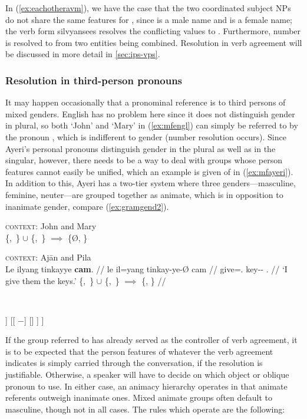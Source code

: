 In (\ref{ex:eachotheravm}), we have the case that the two coordinated subject
NPs do not share the same features for \Gend{}, since  is a male
name and  is a female name; the verb form 
{silvyan}{sees} resolves the conflicting values to \M{}. Furthermore, number is
resolved to \Pl{} from two \Sg{} entities being combined. Resolution in verb
agreement will be discussed in more detail in \autoref{sec:ips-vps}.

\subsubsection{Resolution in third-person pronouns}


It may happen occasionally that a pronominal reference is to third persons of
mixed genders. English has no problem here since it does not distinguish gender
in plural, so both `John' and `Mary' in (\ref{ex:mfengl}) can simply be
referred to by the pronoun , which is indifferent to gender (number
resolution occurs). Since Ayeri's personal pronouns distinguish gender in the
plural as well as in the singular, however, there needs to be a way to deal
with groups whose person features cannot easily be unified, which an example is
given of in (\ref{ex:mfayeri}). In addition to this, Ayeri has a two-tier
system where three genders---masculine, feminine, neuter---are grouped together
as animate, which is in opposition to inanimate gender, compare
(\ref{ex:gramgend2}).

\pex
\a\label{ex:mfengl}%
	\textsc{context:} John and Mary \medskip \\
	\hfill \{\M{},~\Sg{}\} $\cup$  \{\F{},~\Sg{}\} $\implies$ \{Ø, \Pl\}

\a\label{ex:mfayeri}%
	\textsc{context:} Ajān and Pila \medskip \\
	\begingl
	\gla Le ilyang tinkayye \textbf{cam}. //
	\glb le il=yang tinkay-ye-Ø cam //
	\glc \PatTI{} give=\Fsg{}.\Aarg{} key-\Pl{}-\Top{} \TplM{}.\Dat{} //
	\glft `I give them the keys.' 
	\hfill \{\M{},~\Sg{}\} $\cup$ \{\F{},~\Sg{}\} $\implies$ \{\M, \Pl\} //
	\endgl
\xe

\ex~\label{ex:gramgend2}
\begin{forest}
[{[\Gend{}]}
	[{[\Anim{} $+$]}
		[\M]
		[\F]
		[\N]
	]
	[{[\Anim{} $-$]}
		[\Inan]
	]
]
\end{forest}
\xe

If the group referred to has already served as the controller of verb
agreement, it is to be expected that the person features of whatever the verb
agreement indicates is simply carried through the conversation, if the
resolution is justifiable. Otherwise, a speaker will have to decide on which
object or oblique pronoun to use. In either case, an animacy hierarchy operates
in that animate referents outweigh inanimate ones. Mixed animate groups often
default to masculine, though not in all cases. The rules which operate are the
following:

